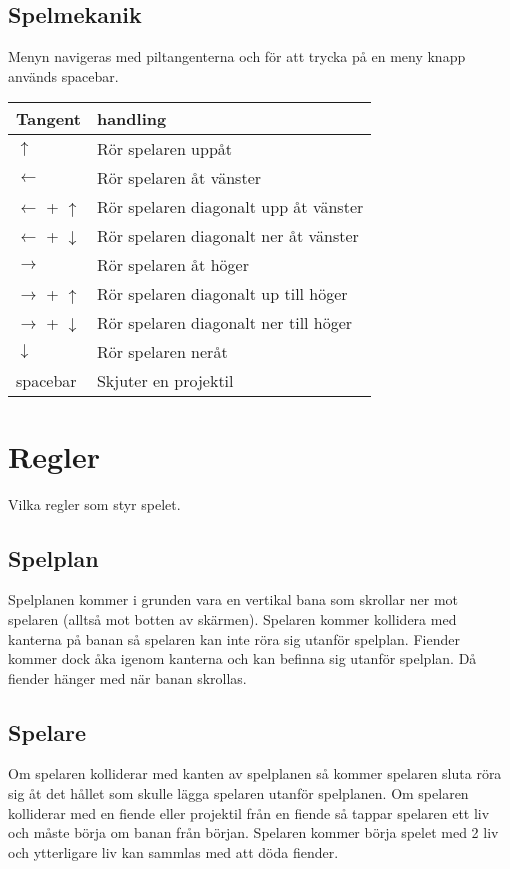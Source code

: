 \documentclass{TDP005mall}
\begin{document}
\subsection{Spelmekanik}
Menyn navigeras med piltangenterna och för att trycka på en meny knapp används spacebar.
\begin{table}[h]
\begin{tabularx}{\linewidth}{|l|X|}
\hline
  Tangent & handling \\\hline
  $\uparrow$ & Rör spelaren uppåt \\\hline
  $\leftarrow$ & Rör spelaren åt vänster \\\hline
  $\leftarrow$ + $\uparrow$ & Rör spelaren diagonalt upp åt vänster \\\hline
  $\leftarrow$ + $\downarrow$ & Rör spelaren diagonalt ner åt vänster \\\hline
  $\rightarrow$ & Rör spelaren åt höger \\\hline
  $\rightarrow$ + $\uparrow$ & Rör spelaren diagonalt up till höger \\\hline
  $\rightarrow$ + $\downarrow$ & Rör spelaren diagonalt ner till höger \\\hline
  $\downarrow$ & Rör spelaren neråt \\\hline
  spacebar & Skjuter en projektil \\\hline  
\end{tabularx}
\end{table}
\section{Regler}
Vilka regler som styr spelet.
\subsection{Spelplan}
Spelplanen kommer i grunden vara en vertikal bana som skrollar ner mot spelaren (alltså mot botten av skärmen).
Spelaren kommer kollidera med kanterna på banan så spelaren kan inte röra sig utanför spelplan.
Fiender kommer dock åka igenom kanterna och kan befinna sig utanför spelplan. Då fiender hänger med när banan skrollas. 


\subsection{Spelare}
Om spelaren kolliderar med kanten av spelplanen så kommer spelaren sluta röra sig åt det hållet som skulle lägga spelaren 
utanför spelplanen. 
Om spelaren kolliderar med en fiende eller projektil från en fiende så tappar spelaren ett liv och 
måste börja om banan från början.
Spelaren kommer börja spelet med 2 liv och ytterligare liv kan sammlas med att döda fiender.
\end{document}
